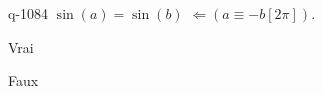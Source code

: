 \begin{truefalse}{q-1084}
$\sin(a)=\sin(b)$  $\Leftarrow \left(a\equiv -b [2\pi]\right)$.
\item Vrai
\item* Faux
\end{truefalse}

